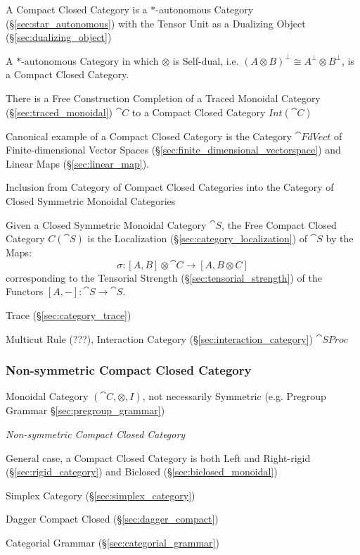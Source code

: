 A Compact Closed Category is a $*$-autonomous Category
(\S\ref{sec:star_autonomous}) with the Tensor Unit as a Dualizing
Object (\S\ref{sec:dualizing_object})

A $*$-autonomous Category in which $\otimes$ is Self-dual, i.e. $(A
\otimes B)^\bot \cong A^\bot \otimes B^\bot$, is a Compact Closed
Category. \cite{abramsky-gay-nagarajan96}

There is a Free Construction Completion of a Traced Monoidal Category
(\S\ref{sec:traced_monoidal}) $\cat{C}$ to a Compact Closed Category
$Int(\cat{C})$

Canonical example of a Compact Closed Category is the Category
$\cat{FdVect}$ of Finite-dimensional Vector Spaces
(\S\ref{sec:finite_dimensional_vectorspace}) and Linear Maps
(\S\ref{sec:linear_map}).

Inclusion from Category of Compact Closed Categories into the Category
of Closed Symmetric Monoidal Categories

Given a Closed Symmetric Monoidal Category $\cat{S}$, the Free Compact
Closed Category $C(\cat{S})$ is the Localization
(\S\ref{sec:category_localization}) of $\cat{S}$ by the Maps:
\[
  \sigma:[A,B] \otimes \cat{C} \rightarrow [A,B \otimes C]
\]
corresponding to the Tensorial Strength
(\S\ref{sec:tensorial_strength}) of the Functors $[A,-]: \cat{S}
\rightarrow \cat{S}$.

Trace (\S\ref{sec:category_trace})

Multicut Rule (???), Interaction Category
(\S\ref{sec:interaction_category}) $\cat{SProc}$



\subsubsection{Non-symmetric Compact Closed Category}
\label{sec:nonsymmetric_compact_closed}

Monoidal Category $(\cat{C}, \otimes, I)$, not necessarily Symmetric
(e.g. Pregroup Grammar \S\ref{sec:pregroup_grammar})

\emph{Non-symmetric Compact Closed Category}

General case, a Compact Closed Category is both Left and Right-rigid
(\S\ref{sec:rigid_category}) and Biclosed
(\S\ref{sec:biclosed_monoidal})

Simplex Category (\S\ref{sec:simplex_category})

Dagger Compact Closed (\S\ref{sec:dagger_compact})

Categorial Grammar (\S\ref{sec:categorial_grammar})



